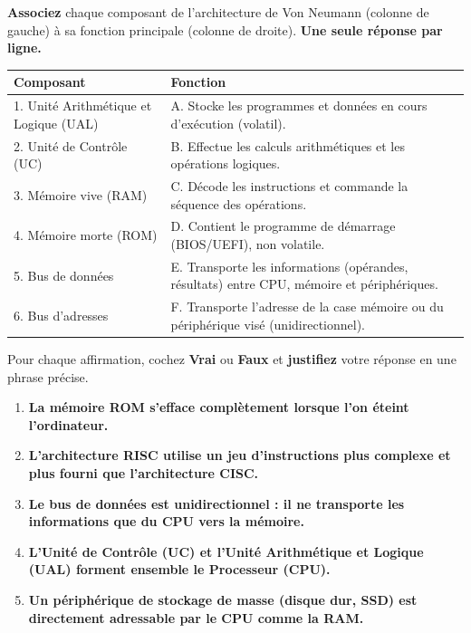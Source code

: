 \documentclass[11pt]{article}
\begin{document}
\begin{exercice}
\textbf{Associez} chaque composant de l'architecture de Von Neumann (colonne de gauche) à sa fonction principale (colonne de droite). \textbf{Une seule réponse par ligne.}

\begin{center}
\begin{tabularx}{\linewidth}{|l|X|}
\hline
\rowcolor{popblueL}
\textbf{Composant} & \textbf{Fonction} \\
\hline
1. Unité Arithmétique et Logique (UAL) & A. Stocke les programmes et données en cours d'exécution (volatil). \\
\hline
2. Unité de Contrôle (UC) & B. Effectue les calculs arithmétiques et les opérations logiques. \\
\hline
3. Mémoire vive (RAM) & C. Décode les instructions et commande la séquence des opérations. \\
\hline
4. Mémoire morte (ROM) & D. Contient le programme de démarrage (BIOS/UEFI), non volatile. \\
\hline
5. Bus de données & E. Transporte les informations (opérandes, résultats) entre CPU, mémoire et périphériques. \\
\hline
6. Bus d'adresses & F. Transporte l'adresse de la case mémoire ou du périphérique visé (unidirectionnel). \\
\hline
\end{tabularx}
\end{center}
\end{exercice}

\begin{exercice}
Pour chaque affirmation, cochez \textbf{Vrai} ou \textbf{Faux} et \textbf{justifiez} votre réponse en une phrase précise.

\begin{enumerate}
    \item \textbf{La mémoire ROM s'efface complètement lorsque l'on éteint l'ordinateur.}
    \item \textbf{L'architecture RISC utilise un jeu d'instructions plus complexe et plus fourni que l'architecture CISC.}
    \item \textbf{Le bus de données est unidirectionnel : il ne transporte les informations que du CPU vers la mémoire.}
    \item \textbf{L'Unité de Contrôle (UC) et l'Unité Arithmétique et Logique (UAL) forment ensemble le Processeur (CPU).}
    \item \textbf{Un périphérique de stockage de masse (disque dur, SSD) est directement adressable par le CPU comme la RAM.}
\end{enumerate}
\end{exercice}
\end{document}
